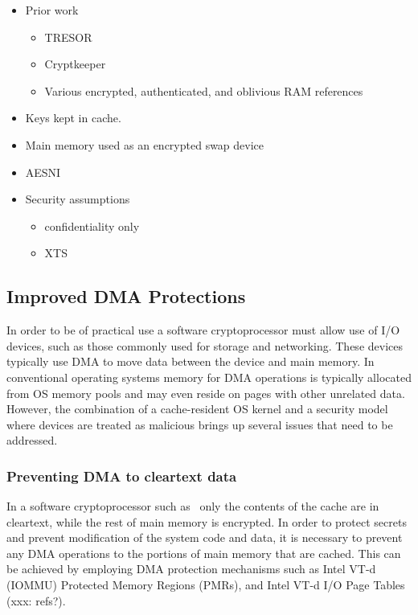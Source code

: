 \begin{itemize}
  \item Prior work
    \begin{itemize}
      \item TRESOR
      \item Cryptkeeper
      \item Various encrypted, authenticated, and oblivious RAM references
    \end{itemize}

  \item Keys kept in cache.
  \item Main memory used as an encrypted swap device
  \item AESNI
  \item Security assumptions
    \begin{itemize}
      \item confidentiality only
      \item XTS
    \end{itemize}
\end{itemize}

\subsection{Improved DMA Protections}

In order to be of practical use a software cryptoprocessor must allow use of I/O devices, such as those commonly used for storage and networking. These devices typically use DMA to move data between the device and main memory. In conventional operating systems memory for DMA operations is typically allocated from OS memory pools and may even reside on pages with other unrelated data. However, the combination of a cache-resident OS kernel and a security model where devices are treated as malicious brings up several issues that need to be addressed.

\subsubsection{Preventing DMA to cleartext data}
\label{sec:dma-prot}

In a software cryptoprocessor such as \vcage\, only the contents of the cache are in cleartext, while the rest of main memory is encrypted. In order to protect secrets and prevent modification of the system code and data, it is necessary to prevent any DMA operations to the portions of main memory that are cached. This can be achieved by employing DMA protection mechanisms such as Intel VT-d (IOMMU) Protected Memory Regions (PMRs), and Intel VT-d I/O Page Tables (xxx: refs?).

